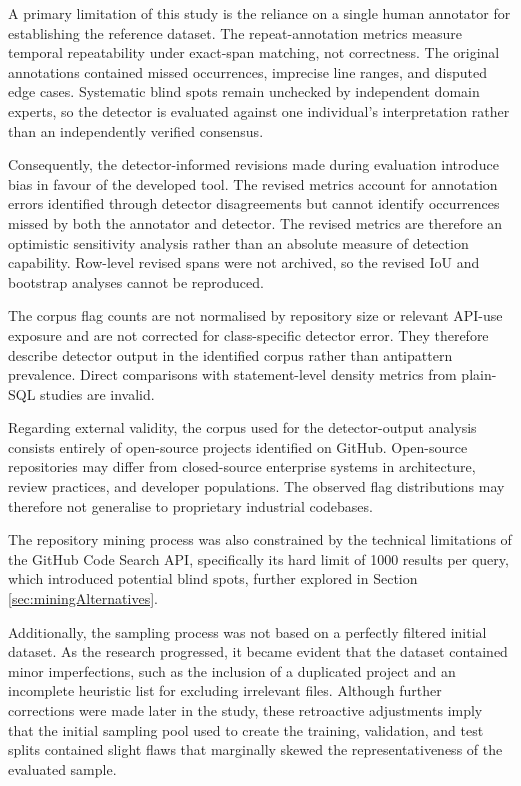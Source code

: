A primary limitation of this study is the reliance on a single human annotator for establishing the reference dataset. The repeat-annotation metrics measure temporal repeatability under exact-span matching, not correctness. The original annotations contained missed occurrences, imprecise line ranges, and disputed edge cases. Systematic blind spots remain unchecked by independent domain experts, so the detector is evaluated against one individual's interpretation rather than an independently verified consensus.

Consequently, the detector-informed revisions made during evaluation introduce bias in favour of the developed tool. The revised metrics account for annotation errors identified through detector disagreements but cannot identify occurrences missed by both the annotator and detector. The revised metrics are therefore an optimistic sensitivity analysis rather than an absolute measure of detection capability. Row-level revised spans were not archived, so the revised IoU and bootstrap analyses cannot be reproduced.

The corpus flag counts are not normalised by repository size or relevant API-use exposure and are not corrected for class-specific detector error. They therefore describe detector output in the identified corpus rather than antipattern prevalence. Direct comparisons with statement-level density metrics from plain-SQL studies are invalid.

Regarding external validity, the corpus used for the detector-output analysis consists entirely of open-source projects identified on GitHub. Open-source repositories may differ from closed-source enterprise systems in architecture, review practices, and developer populations. The observed flag distributions may therefore not generalise to proprietary industrial codebases.

The repository mining process was also constrained by the technical limitations of the GitHub Code Search API, specifically its hard limit of \num{1000} results per query, which introduced potential blind spots, further explored in Section \ref{sec:miningAlternatives}.

Additionally, the sampling process was not based on a perfectly filtered initial dataset. As the research progressed, it became evident that the dataset contained minor imperfections, such as the inclusion of a duplicated project and an incomplete heuristic list for excluding irrelevant files. Although further corrections were made later in the study, these retroactive adjustments imply that the initial sampling pool used to create the training, validation, and test splits contained slight flaws that marginally skewed the representativeness of the evaluated sample.

